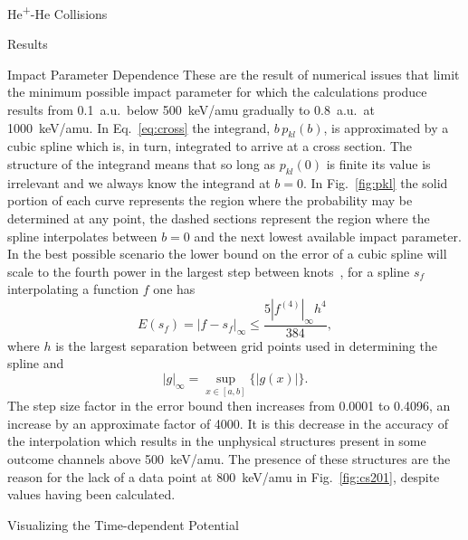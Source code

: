 \documentclass[letterpaper, 11 pt]{report}
\begin{document}
\begin{chapter}{\texorpdfstring{He\textsuperscript{+}}{He+}-He Collisions \label{chap:hephe}}
\begin{section}{Results \label{sec:hephe-disc}}
\begin{subsection}{Impact Parameter Dependence}
         These are the result of numerical issues that limit the minimum possible impact parameter for
         which the calculations produce results from 0.1~a.u.\ below 500~keV/amu gradually to 0.8~a.u.\
         at 1000~keV/amu. In Eq.~\eqref{eq:cross} the integrand, $b \, p_{kl}(b)$, is approximated by a
         cubic spline which is, in turn, integrated to arrive at a cross section. The structure of the
         integrand means that so long as $p_{kl}(0)$ is finite its value is irrelevant and we always
         know the integrand at $b = 0$. In Fig.~\ref{fig:pkl} the solid portion of each curve represents
         the region where the probability may be determined at any point, the dashed sections represent
         the region where the spline interpolates between $b = 0$ and the next lowest available impact
         parameter. In the best possible scenario the lower bound on the error of a cubic spline will
         scale to the fourth power in the largest step between knots~\cite{spline-err}, for a spline
         $s_f$ interpolating a function $f$ one has
         \begin{equation} \label{eq:splineErr}
            E(s_f) = \left| f - s_f \right|_\infty \leq \frac{5 \left| f^{(4)} \right|_\infty h^4}{384},
         \end{equation}
         where $h$ is the largest separation between grid points used in determining the spline and
         \begin{equation} \label{eq:supnorm}
            | g |_\infty = \sup\limits_{x \in [a,b]} \{ |g(x)| \}.
         \end{equation}
         The step size factor in the error bound then increases from 0.0001 to 0.4096, an increase by an
         approximate factor of 4000. It is this decrease in the accuracy of the interpolation which
         results in the unphysical structures present in some outcome channels above 500~keV/amu. The
         presence of these structures are the reason for the lack of a data point at 800~keV/amu in
         Fig.~\ref{fig:cs201}, despite values having been calculated.

      \end{subsection}

      \begin{subsection}{Visualizing the Time-dependent Potential \label{sec:visual}}


\end{subsection}
\end{section}
\end{chapter}
\end{document}
